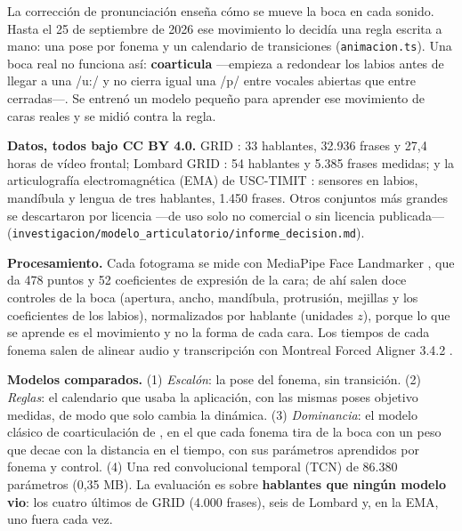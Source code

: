 \documentclass[11pt,a4paper]{article}
\newcommand{\cod}[1]{\texttt{\small #1}}
\newcommand{\ipalong}{\ifPDFTeX:\else{\fontspec{Segoe UI}ː}\fi}
\begin{document}
La corrección de pronunciación enseña cómo se mueve la boca en cada sonido. Hasta el 25 de
septiembre de 2026 ese movimiento lo decidía una regla escrita a mano: una pose por fonema y
un calendario de transiciones (\cod{animacion.ts}). Una boca real no funciona así:
\textbf{coarticula} ---empieza a redondear los labios antes de llegar a una /u\ipalong/ y no cierra
igual una /p/ entre vocales abiertas que entre cerradas---. Se entrenó un modelo pequeño para
aprender ese movimiento de caras reales y se midió contra la regla.

\textbf{Datos, todos bajo CC BY 4.0.} GRID \parencite{cooke2006grid}: 33 hablantes, 32.936
frases y 27,4 horas de vídeo frontal; Lombard GRID \parencite{alghamdi2018lombard}: 54
hablantes y 5.385 frases medidas; y la articulografía electromagnética (EMA) de USC-TIMIT
\parencite{narayanan2014usctimit}: sensores en labios, mandíbula y lengua de tres hablantes,
1.450 frases. Otros conjuntos más grandes se descartaron por licencia ---de uso solo no
comercial o sin licencia publicada--- (\cod{investigacion/\allowbreak modelo\_articulatorio/\allowbreak informe\_decision.md}).

\textbf{Procesamiento.} Cada fotograma se mide con MediaPipe Face Landmarker
\parencite{lugaresi2019mediapipe}, que da 478 puntos y 52 coeficientes de expresión de la
cara; de ahí salen doce controles de la boca (apertura, ancho, mandíbula, protrusión, mejillas
y los coeficientes de los labios), normalizados por hablante (unidades $z$), porque lo que se
aprende es el movimiento y no la forma de cada cara. Los tiempos de cada fonema salen de
alinear audio y transcripción con Montreal Forced Aligner 3.4.2 \parencite{mcauliffe2017mfa}.

\textbf{Modelos comparados.} (1) \emph{Escalón}: la pose del fonema, sin transición.
(2) \emph{Reglas}: el calendario que usaba la aplicación, con las mismas poses objetivo
medidas, de modo que solo cambia la dinámica. (3) \emph{Dominancia}: el modelo clásico de
coarticulación de \textcite{cohen1993coarticulation}, en el que cada fonema tira de la boca con
un peso que decae con la distancia en el tiempo, con sus parámetros aprendidos por fonema y
control. (4) Una red convolucional temporal (TCN) \parencite{bai2018tcn} de 86.380 parámetros
(0,35 MB). La evaluación es sobre \textbf{hablantes que ningún modelo vio}: los cuatro últimos
de GRID (4.000 frases), seis de Lombard y, en la EMA, uno fuera cada vez.
\end{document}
